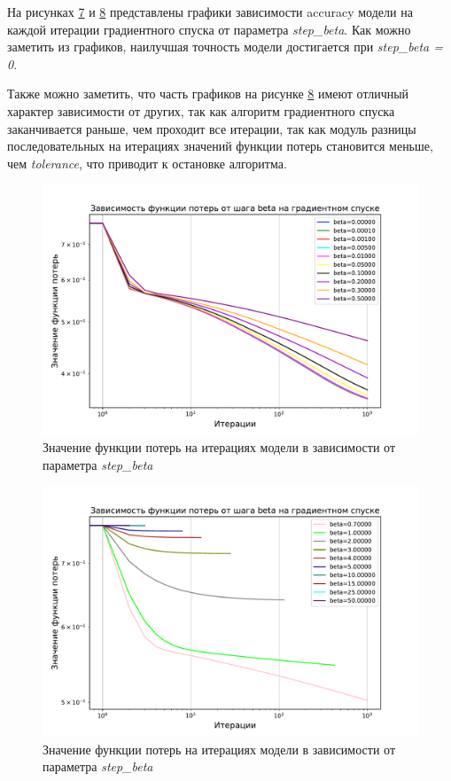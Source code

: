 \documentclass[14pt]{extarticle}
\begin{document}
На рисунках \hyperref[fig:exp_4_acc_beta_1]{7} и \hyperref[fig:exp_4_acc_beta_2]{8} представлены графики зависимости accuracy модели на каждой итерации градиентного спуска от параметра \textit{step\_beta}. Как можно заметить из графиков, наилучшая точность модели достигается при \textit{step\_beta = 0}.

Также можно заметить, что часть графиков на рисунке \hyperref[fig:exp_4_acc_beta_2]{8} имеют отличный характер зависимости от других, так как алгоритм градиентного спуска заканчивается раньше, чем проходит все итерации, так как модуль разницы последовательных на итерациях значений функции потерь становится меньше, чем \textit{tolerance}, что приводит к остановке алгоритма.

\begin{figure}[H]
    \centering
    \includegraphics[width=0.7\linewidth]
    {exp_4_loss_beta_1.pdf}
    \caption{Значение функции потерь на итерациях модели в зависимости от параметра \textit{step\_beta}}
    \label{fig:exp_4_loss_beta_1}
\end{figure}

\begin{figure}[H]
    \centering
    \includegraphics[width=0.7\linewidth]
    {exp_4_loss_beta_2.pdf}
    \caption{Значение функции потерь на итерациях модели в зависимости от параметра \textit{step\_beta}}
    \label{fig:exp_4_loss_beta_2}
\end{figure}
\end{document}

